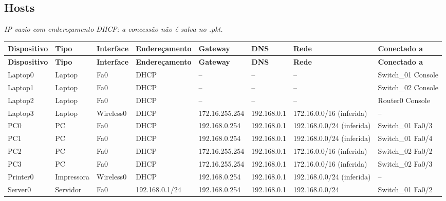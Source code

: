 \subsection{Hosts}
\noindent\textit{IP vazio com endereçamento DHCP: a concessão não é salva no .pkt.}\par\smallskip
\begingroup\scriptsize\setlength{\tabcolsep}{3pt}
\begin{longtable}{@{}p{}p{}p{}p{}p{}p{}p{}p{}@{}}
\toprule \textbf{Dispositivo} & \textbf{Tipo} & \textbf{Interface} & \textbf{Endereçamento} & \textbf{Gateway} & \textbf{DNS} & \textbf{Rede} & \textbf{Conectado a} \\\midrule\endfirsthead
\toprule \textbf{Dispositivo} & \textbf{Tipo} & \textbf{Interface} & \textbf{Endereçamento} & \textbf{Gateway} & \textbf{DNS} & \textbf{Rede} & \textbf{Conectado a} \\\midrule\endhead
Laptop0 & Laptop & Fa0 & DHCP & -- & -- & -- & Switch\_01 Console \\
Laptop1 & Laptop & Fa0 & DHCP & -- & -- & -- & Switch\_02 Console \\
Laptop2 & Laptop & Fa0 & DHCP & -- & -- & -- & Router0 Console \\
Laptop3 & Laptop & Wireless0 & DHCP & 172.16.255.254 & 192.168.0.1 & 172.16.0.0/16 (inferida) & -- \\
PC0 & PC & Fa0 & DHCP & 192.168.0.254 & 192.168.0.1 & 192.168.0.0/24 (inferida) & Switch\_01 Fa0/3 \\
PC1 & PC & Fa0 & DHCP & 192.168.0.254 & 192.168.0.1 & 192.168.0.0/24 (inferida) & Switch\_01 Fa0/4 \\
PC2 & PC & Fa0 & DHCP & 172.16.255.254 & 192.168.0.1 & 172.16.0.0/16 (inferida) & Switch\_02 Fa0/2 \\
PC3 & PC & Fa0 & DHCP & 172.16.255.254 & 192.168.0.1 & 172.16.0.0/16 (inferida) & Switch\_02 Fa0/3 \\
Printer0 & Impressora & Wireless0 & DHCP & 192.168.0.254 & 192.168.0.1 & 192.168.0.0/24 (inferida) & -- \\
Server0 & Servidor & Fa0 & 192.168.0.1/24 & 192.168.0.254 & 192.168.0.1 & 192.168.0.0/24 & Switch\_01 Fa0/2 \\
\bottomrule
\end{longtable}\endgroup

